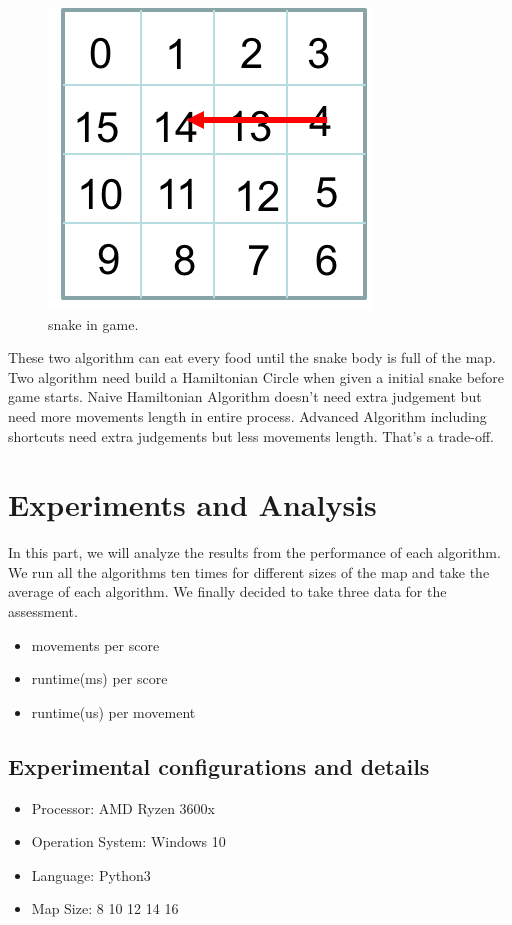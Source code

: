 \documentclass[12pt]{article}
\begin{document}
\begin{figure}[H]
\centering 
\includegraphics[scale = 0.8]{Picture3.png}
\caption{snake in game.}
\label{fig:figure4label}
\end{figure}

These two algorithm can eat every food until the snake body is full of the map. Two algorithm need build a Hamiltonian Circle when given a initial snake before game starts. Naive Hamiltonian Algorithm doesn't need extra judgement but need more movements length in entire process. Advanced Algorithm including shortcuts need extra judgements but less movements length. That's a trade-off.

\section{Experiments and Analysis}

In this part, we will analyze the results from the performance of each algorithm. We run all the algorithms ten times for different sizes of the map and take the average of each algorithm. We finally decided to take three data for the assessment.
\begin{itemize}
    \item movements per score
    \item runtime(ms) per score
    \item runtime(us) per movement
\end{itemize}

\subsection{Experimental configurations and details}
\begin{itemize}
    \item Processor: AMD Ryzen 3600x
    \item Operation System: Windows 10
    \item Language: Python3
    \item Map Size: 8 10 12 14 16
\end{itemize}
\end{document}
